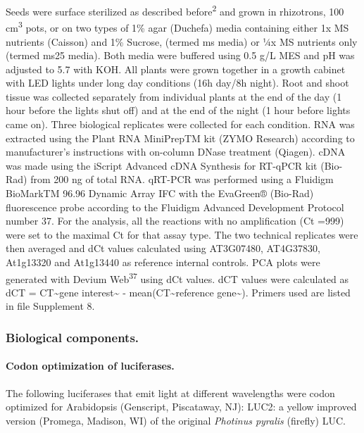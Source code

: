 \documentclass[]{article}
\begin{document}
Seeds were surface sterilized as described before\textsuperscript{2} and
grown in rhizotrons, 100 cm\textsuperscript{3} pots, or on two types of
1\% agar (Duchefa) media containing either 1x MS nutrients (Caisson) and
1\% Sucrose, (termed ms media) or ¼x MS nutrients only (termed ms25
media). Both media were buffered using 0.5 g/L MES and pH was adjusted
to 5.7 with KOH. All plants were grown together in a growth cabinet with
LED lights under long day conditions (16h day/8h night). Root and shoot
tissue was collected separately from individual plants at the end of the
day (1 hour before the lights shut off) and at the end of the night (1
hour before lights came on). Three biological replicates were collected
for each condition. RNA was extracted using the Plant RNA MiniPrepTM kit
(ZYMO Research) according to manufacturer's instructions with on-column
DNase treatment (Qiagen). cDNA was made using the iScript Advanced cDNA
Synthesis for RT-qPCR kit (Bio-Rad) from 200 ng of total RNA. qRT-PCR
was performed using a Fluidigm BioMarkTM 96.96 Dynamic Array IFC with
the EvaGreen® (Bio-Rad) fluorescence probe according to the Fluidigm
Advanced Development Protocol number 37. For the analysis, all the
reactions with no amplification (Ct =999) were set to the maximal Ct for
that assay type. The two technical replicates were then averaged and dCt
values calculated using AT3G07480, AT4G37830, At1g13320 and At1g13440 as
reference internal controls. PCA plots were generated with Devium
Web\textsuperscript{37} using dCt values. dCT values were calculated as
dCT = CT\textasciitilde{}gene interest\textasciitilde{} -
mean(CT\textasciitilde{}reference gene\textasciitilde{}). Primers used
are listed in file Supplement 8.

\subsubsection{Biological components.}\label{biological-components.}

\paragraph{Codon optimization of
luciferases.}\label{codon-optimization-of-luciferases.}

The following luciferases that emit light at different wavelengths were
codon optimized for Arabidopsis (Genscript, Piscataway, NJ): LUC2: a
yellow improved version (Promega, Madison, WI) of the original
\emph{Photinus pyralis} (firefly) LUC.
\end{document}
